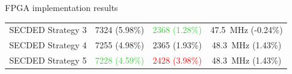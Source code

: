 \begin{frame}{FPGA implementation results}
{\begin{table}[t]
\begin{tabular}{@{}rccc@{}}
            SECDED Strategy 3          & \num{7324} {\tiny (5.98\%)}                        & \textcolor{LimeGreen}{\num{2368} {\tiny (1.28\%)}} & \SI{47.5}{\mega\hertz} {\tiny (-0.24\%)} \\
            SECDED Strategy 4          & \num{7255} {\tiny (4.98\%)}                        & \num{2365} {\tiny (1.93\%)}                        & \SI{48.3}{\mega\hertz} {\tiny (1.43\%) } \\
            SECDED Strategy 5          & \textcolor{LimeGreen}{\num{7228} {\tiny (4.59\%)}} & \textcolor{red}{\num{2428} {\tiny (3.98\%)}}       & \SI{48.3}{\mega\hertz} {\tiny (1.43\%) } \\
            \bottomrule
        \end{tabular}
    \end{table}
    }

\end{frame}
